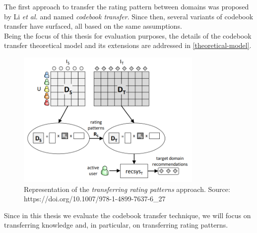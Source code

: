 \begin{itemize}
\begin{itemize}
The first approach to transfer the rating pattern between domains was proposed by Li \textit{et al.} \cite{10.5555/1661445.1661773} and named \textit{codebook transfer}. Since then, several variants of codebook transfer have surfaced, all based on the same assumptions.\\
Being the focus of this thesis for evaluation purposes, the details of the codebook transfer theoretical model and its extensions are addressed in \autoref{theoretical-model}.
\begin{figure}[hbt!]
  \centering
  \includegraphics[width=0.8\textwidth]{pictures/transferring-rating-patterns}
  \caption{Representation of the \textit{transferring rating patterns} approach. Source: https://doi.org/10.1007/978-1-4899-7637-6\_27}
\end{figure}
\end{itemize}
\end{itemize}
Since in this thesis we evaluate the codebook transfer technique, we will focus on transferring knowledge and, in particular, on transferring rating patterns.